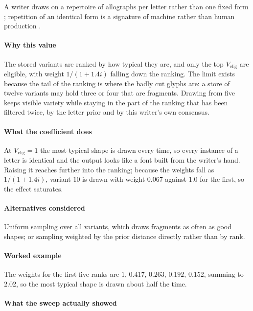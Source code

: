 A writer draws on a repertoire of allographs per letter rather than one fixed form \cite{schomaker1990}; repetition of an identical form is a signature of machine rather than human production \cite{plamondon2000}.

\paragraph{Why this value}

The stored variants are ranked by how typical they are, and only the top $V_{\text{elig}}$ are eligible, with weight $1/(1+1.4i)$ falling down the ranking. The limit exists because the tail of the ranking is where the badly cut glyphs are: a store of twelve variants may hold three or four that are fragments. Drawing from five keeps visible variety while staying in the part of the ranking that has been filtered twice, by the letter prior and by this writer's own consensus.

\paragraph{What the coefficient does}

At $V_{\text{elig}} = 1$ the most typical shape is drawn every time, so every instance of a letter is identical and the output looks like a font built from the writer's hand. Raising it reaches further into the ranking; because the weights fall as $1/(1+1.4i)$, variant $10$ is drawn with weight $0.067$ against $1.0$ for the first, so the effect saturates.

\paragraph{Alternatives considered}

Uniform sampling over all variants, which draws fragments as often as good shapes; or sampling weighted by the prior distance directly rather than by rank.

\paragraph{Worked example}

The weights for the first five ranks are $1,\,0.417,\,0.263,\,0.192,\,0.152$, summing to $2.02$, so the most typical shape is drawn about half the time.

\paragraph{What the sweep actually showed}

